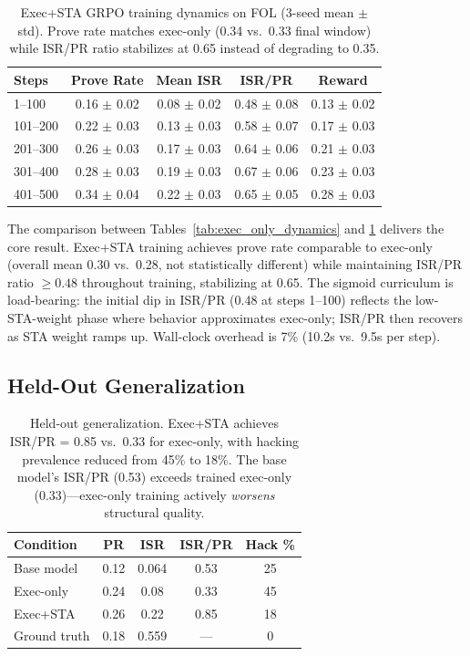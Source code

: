 \documentclass[11pt,a4paper]{article}
\begin{document}
\begin{table}[t]
\centering
\small
\begin{tabular}{lcccc}
\toprule
\textbf{Steps} & \textbf{Prove Rate} & \textbf{Mean ISR} & \textbf{ISR/PR} & \textbf{Reward} \\
\midrule
1--100 & 0.16 $\pm$ 0.02 & 0.08 $\pm$ 0.02 & 0.48 $\pm$ 0.08 & 0.13 $\pm$ 0.02 \\
101--200 & 0.22 $\pm$ 0.03 & 0.13 $\pm$ 0.03 & 0.58 $\pm$ 0.07 & 0.17 $\pm$ 0.03 \\
201--300 & 0.26 $\pm$ 0.03 & 0.17 $\pm$ 0.03 & 0.64 $\pm$ 0.06 & 0.21 $\pm$ 0.03 \\
301--400 & 0.28 $\pm$ 0.03 & 0.19 $\pm$ 0.03 & 0.67 $\pm$ 0.06 & 0.23 $\pm$ 0.03 \\
401--500 & 0.34 $\pm$ 0.04 & 0.22 $\pm$ 0.03 & 0.65 $\pm$ 0.05 & 0.28 $\pm$ 0.03 \\
\bottomrule
\end{tabular}
\caption{Exec+STA GRPO training dynamics on FOL (3-seed mean $\pm$ std). Prove rate matches exec-only (0.34 vs.\ 0.33 final window) while ISR/PR ratio stabilizes at 0.65 instead of degrading to 0.35.}
\label{tab:exec_sta_dynamics}
\end{table}

The comparison between Tables~\ref{tab:exec_only_dynamics} and \ref{tab:exec_sta_dynamics} delivers the core result. Exec+STA training achieves prove rate comparable to exec-only (overall mean 0.30 vs.\ 0.28, not statistically different) while maintaining ISR/PR ratio $\geq 0.48$ throughout training, stabilizing at 0.65. The sigmoid curriculum is load-bearing: the initial dip in ISR/PR (0.48 at steps 1--100) reflects the low-STA-weight phase where behavior approximates exec-only; ISR/PR then recovers as STA weight ramps up. Wall-clock overhead is 7\% (10.2s vs.\ 9.5s per step).

\subsection{Held-Out Generalization}
\label{sec:held_out}

\begin{table}[t]
\centering
\small
\begin{tabular}{lcccc}
\toprule
\textbf{Condition} & \textbf{PR} & \textbf{ISR} & \textbf{ISR/PR} & \textbf{Hack \%} \\
\midrule
Base model & 0.12 & 0.064 & 0.53 & 25 \\
Exec-only & 0.24 & 0.08 & 0.33 & 45 \\
Exec+STA & 0.26 & 0.22 & 0.85 & 18 \\
Ground truth & 0.18 & 0.559 & --- & 0 \\
\bottomrule
\end{tabular}
\caption{Held-out generalization. Exec+STA achieves ISR/PR = 0.85 vs.\ 0.33 for exec-only, with hacking prevalence reduced from 45\% to 18\%. The base model's ISR/PR (0.53) exceeds trained exec-only (0.33)---exec-only training actively \emph{worsens} structural quality.}
\label{tab:held_out}
\end{table}
\end{document}

